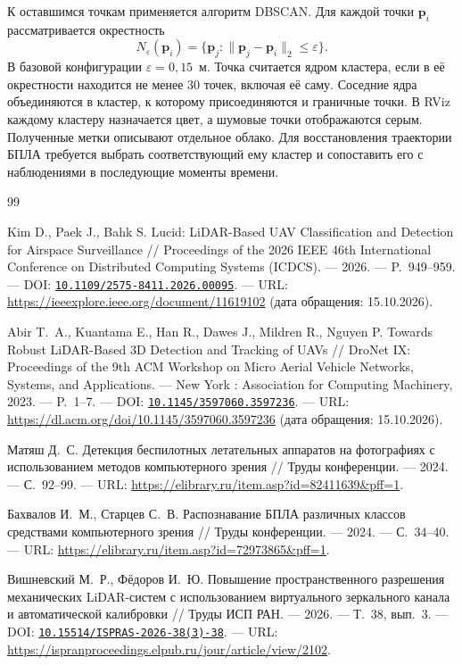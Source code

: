 \documentclass{misisarticle}
\begin{document}
К оставшимся точкам применяется алгоритм DBSCAN. Для каждой точки $\mathbf p_i$ рассматривается окрестность
\begin{equation}
  N_\varepsilon(\mathbf p_i)=
  \{\mathbf p_j:\|\mathbf p_j-\mathbf p_i\|_2\leq\varepsilon\}.
\end{equation}
В базовой конфигурации $\varepsilon=0{,}15$~м. Точка считается ядром кластера, если в её окрестности находится не менее 30 точек, включая её саму. Соседние ядра объединяются в кластер, к которому присоединяются и граничные точки. В RViz каждому кластеру назначается цвет, а шумовые точки отображаются серым. Полученные метки описывают отдельное облако. Для восстановления траектории БПЛА требуется выбрать соответствующий ему кластер и сопоставить его с наблюдениями в последующие моменты времени.
\begin{thebibliography}{99}

 Kim D., Paek J., Bahk S. Lucid: LiDAR-Based UAV Classification and Detection for Airspace Surveillance // Proceedings of the 2026 IEEE 46th International Conference on Distributed Computing Systems (ICDCS). --- 2026. --- P.~949--959. --- DOI: \href{https://doi.org/10.1109/2575-8411.2026.00095}{\nolinkurl{10.1109/2575-8411.2026.00095}}. --- URL: \url{https://ieeexplore.ieee.org/document/11619102} (дата обращения: 15.10.2026).

 Abir T.~A., Kuantama E., Han R., Dawes J., Mildren R., Nguyen P. Towards Robust LiDAR-Based 3D Detection and Tracking of UAVs // DroNet IX: Proceedings of the 9th ACM Workshop on Micro Aerial Vehicle Networks, Systems, and Applications. --- New York : Association for Computing Machinery, 2023. --- P.~1--7. --- DOI: \href{https://doi.org/10.1145/3597060.3597236}{\nolinkurl{10.1145/3597060.3597236}}. --- URL: \url{https://dl.acm.org/doi/10.1145/3597060.3597236} (дата обращения: 15.10.2026).

 Матяш Д.~С. Детекция беспилотных летательных аппаратов на фотографиях с использованием методов компьютерного зрения // Труды конференции. --- 2024. --- С.~92--99. --- URL: \url{https://elibrary.ru/item.asp?id=82411639&pff=1}.

 Бахвалов И.~М., Старцев С.~В. Распознавание БПЛА различных классов средствами компьютерного зрения // Труды конференции. --- 2024. --- С.~34--40. --- URL: \url{https://elibrary.ru/item.asp?id=72973865&pff=1}.

 Вишневский М.~Р., Фёдоров И.~Ю. Повышение пространственного разрешения механических LiDAR-систем с использованием виртуального зеркального канала и автоматической калибровки // Труды ИСП РАН. --- 2026. --- Т.~38, вып.~3. --- DOI: \href{https://doi.org/10.15514/ISPRAS-2026-38(3)-38}{\nolinkurl{10.15514/ISPRAS-2026-38(3)-38}}. --- URL: \url{https://ispranproceedings.elpub.ru/jour/article/view/2102}.


\end{thebibliography}
\end{document}
